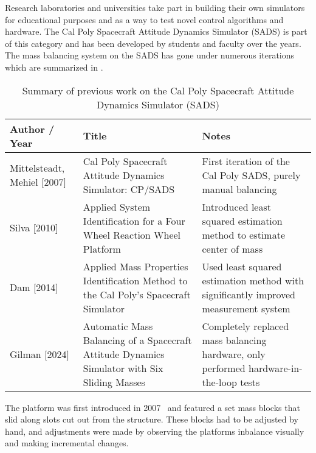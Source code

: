 Research laboratories and universities take part in building their own simulators for educational purposes and as a way to test novel control algorithms and hardware. The Cal Poly Spacecraft Attitude Dynamics Simulator (SADS) is part of this category and has been developed by students and faculty over the years. The mass balancing system on the SADS has gone under numerous iterations which are summarized in .

\begin{table}[h!]
\caption{Summary of previous work on the Cal Poly Spacecraft Attitude Dynamics Simulator (SADS)}
\label{table:sads_history}
\centering
\renewcommand{\arraystretch}{1.4} %

\begin{tabularx}{\textwidth}{
    >{\raggedright\arraybackslash}p{4cm}   %
    >{\raggedright\arraybackslash}p{5cm}   %
    >{\raggedright\arraybackslash}X}       %
\hline
\textbf{Author / Year} & \textbf{Title} & \textbf{Notes} \\
\hline
Mittelsteadt, Mehiel [2007] & 
Cal Poly Spacecraft Attitude Dynamics Simulator: CP/SADS & 
First iteration of the Cal Poly SADS, purely manual balancing \\
[2.0em]

Silva [2010] & 
Applied System Identification for a Four Wheel Reaction Wheel Platform & 
Introduced least squared estimation method to estimate center of mass \\
[2.0em]

Dam [2014] & 
Applied Mass Properties Identification Method to the Cal Poly's Spacecraft Simulator & 
Used least squared estimation method with significantly improved measurement system \\
[2.0em]

Gilman [2024] & 
Automatic Mass Balancing of a Spacecraft Attitude Dynamics Simulator with Six Sliding Masses & 
Completely replaced mass balancing hardware, only performed hardware-in-the-loop tests \\
\hline
\end{tabularx}
\end{table}

The platform was first introduced in 2007~\cite{mittelsteadt_cal_2007} and featured a set mass blocks that slid along slots cut out from the structure. These blocks had to be adjusted by hand, and adjustments were made by observing the platforms inbalance visually and making incremental changes.

